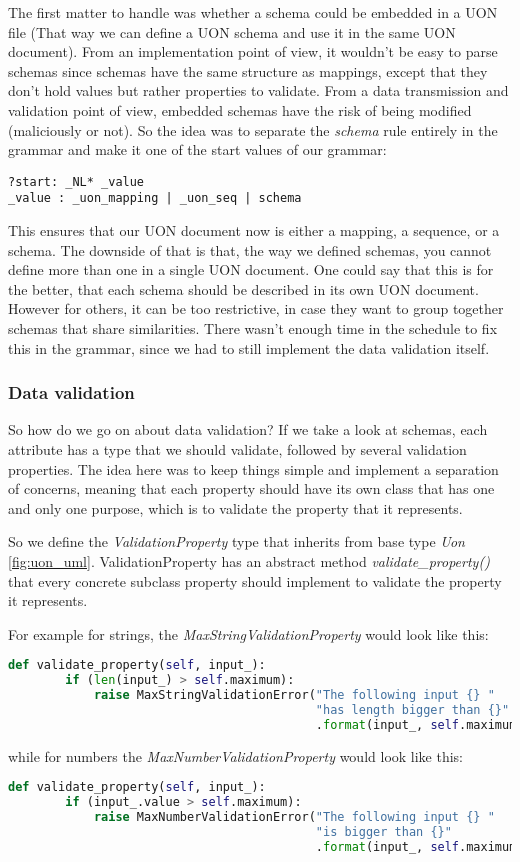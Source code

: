 \documentclass[12pt]{article}
\begin{document}
The first matter to handle was whether a schema could be embedded in a UON file (That way we can define a UON schema and use it in the same UON document). From an implementation point of view, it wouldn't be easy to parse schemas since schemas have the same structure as mappings, except that they don't hold values but rather properties to validate. From a data transmission and validation point of view, embedded schemas have the risk of being modified (maliciously or not). So the idea was to separate the \emph{schema} rule entirely in the grammar and make it one of the start values of our grammar:
\begin{lstlisting}
?start: _NL* _value
_value : _uon_mapping | _uon_seq | schema
\end{lstlisting}
This ensures that our UON document now is either a mapping, a sequence, or a schema. The downside of that is that, the way we defined schemas, you cannot define more than one in a single UON document. One could say that this is for the better, that each schema should be described in its own UON document. However for others, it can be too restrictive, in case they want to group together schemas that share similarities. There wasn't enough time in the schedule to fix this in the grammar, since we had to still implement the data validation itself.

\subsubsection{Data validation}

So how do we go on about data validation? If we take a look at schemas, each attribute has a type that we should validate, followed by several validation properties. The idea here was to keep things simple and implement a separation of concerns, meaning that each property should have its own class that has one and only one purpose, which is to validate the property that it represents. 

So we define the \emph{ValidationProperty} type that inherits from base type \emph{Uon} \ref{fig:uon_uml}. ValidationProperty has an abstract method \emph{validate\_property()} that every concrete subclass property should implement to validate the property it represents.

For example for strings, the \emph{MaxStringValidationProperty} would look like this:
\begin{lstlisting}[language=Python]
def validate_property(self, input_):
        if (len(input_) > self.maximum):
            raise MaxStringValidationError("The following input {} "
                                           "has length bigger than {}"
                                           .format(input_, self.maximum))
\end{lstlisting}
while for numbers the \emph{MaxNumberValidationProperty} would look like this:
\begin{lstlisting}[language=Python]
def validate_property(self, input_):
        if (input_.value > self.maximum):
            raise MaxNumberValidationError("The following input {} "
                                           "is bigger than {}"
                                           .format(input_, self.maximum))
\end{lstlisting}
\end{document}
